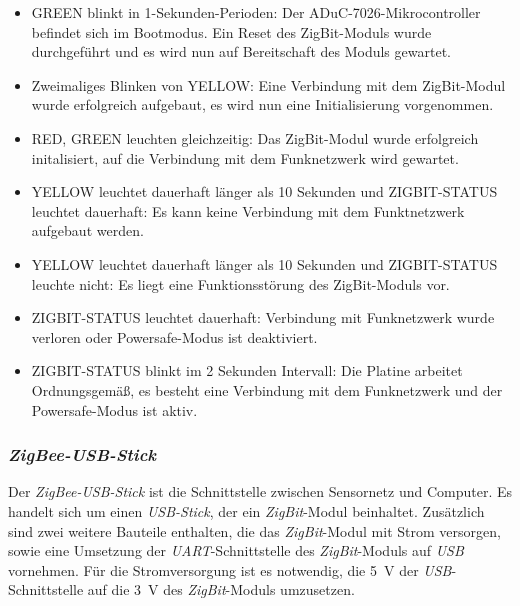 \begin{itemize}
    \item{GREEN blinkt in 1-Sekunden-Perioden:} Der ADuC-7026-Mikrocontroller befindet sich im Bootmodus. Ein Reset des
                                                    ZigBit-Moduls wurde durchgeführt und es wird nun auf Bereitschaft des Moduls
                                                    gewartet.
    \item{Zweimaliges Blinken von YELLOW:} Eine Verbindung mit dem ZigBit-Modul wurde erfolgreich aufgebaut, es wird nun eine 
                                           Initialisierung vorgenommen.
    \item{RED, GREEN leuchten gleichzeitig:} Das ZigBit-Modul wurde erfolgreich initalisiert, auf die Verbindung mit dem 
                                                Funknetzwerk wird gewartet.
    \item{YELLOW leuchtet dauerhaft länger als 10 Sekunden und
          ZIGBIT-STATUS leuchtet dauerhaft:} Es kann keine Verbindung mit dem Funktnetzwerk aufgebaut werden.
    \item{YELLOW leuchtet dauerhaft länger als 10 Sekunden und ZIGBIT-STATUS leuchte nicht:} Es liegt eine Funktionsstörung des
          ZigBit-Moduls vor.
    \item{ZIGBIT-STATUS leuchtet dauerhaft:} Verbindung mit Funknetzwerk wurde verloren oder Powersafe-Modus ist deaktiviert.
    \item{ZIGBIT-STATUS blinkt im 2 Sekunden Intervall:} Die Platine arbeitet Ordnungsgemäß, es besteht eine Verbindung mit dem
                                                        Funknetzwerk und der Powersafe-Modus ist aktiv.
\end{itemize}
                                                        
\subsubsection{\emph{ZigBee-USB-Stick}}

Der \emph{ZigBee-USB-Stick} ist die Schnittstelle zwischen Sensornetz und Computer. Es handelt sich um einen 
\emph{USB-Stick}, der ein \emph{ZigBit}-Modul beinhaltet. Zusätzlich sind zwei weitere Bauteile enthalten, die das 
\emph{ZigBit}-Modul mit Strom versorgen, sowie eine Umsetzung der \emph{UART}-Schnittstelle des \emph{ZigBit}-Moduls 
auf \emph{USB} vornehmen. Für die Stromversorgung ist es notwendig, die 5~V der
\emph{USB}-Schnittstelle auf die 3~V des \emph{ZigBit}-Moduls umzusetzen.

